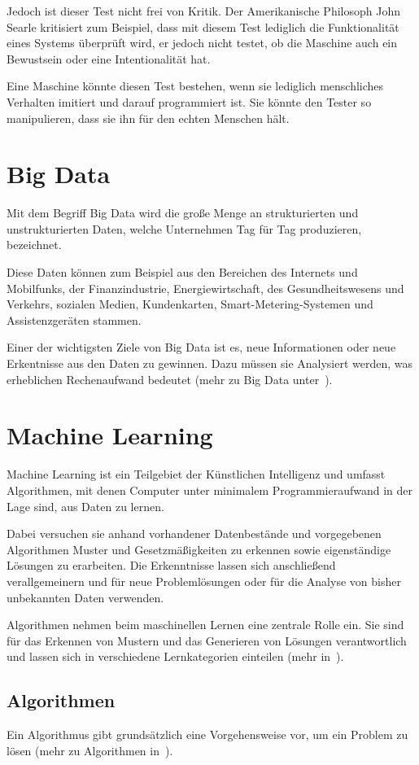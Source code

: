Jedoch ist dieser Test nicht frei von Kritik. Der Amerikanische Philosoph John Searle kritisiert zum Beispiel, dass mit
diesem Test lediglich die Funktionalität eines Systems überprüft wird, er jedoch nicht testet, ob die Maschine auch ein
Bewustsein oder eine Intentionalität hat.

Eine Maschine könnte diesen Test bestehen, wenn sie lediglich menschliches Verhalten imitiert und darauf programmiert
ist. Sie könnte den Tester so manipulieren, dass sie ihn für den echten Menschen hält.

\section{Big Data}
Mit dem Begriff Big Data wird die große Menge an strukturierten und unstrukturierten Daten, welche Unternehmen Tag für
Tag produzieren, bezeichnet.

Diese Daten können zum Beispiel aus den Bereichen des Internets und Mobilfunks, der Finanzindustrie, Energiewirtschaft,
des Gesundheitswesens und Verkehrs, sozialen Medien, Kundenkarten, Smart-Metering-Systemen und Assistenzgeräten stammen.

Einer der wichtigsten Ziele von Big Data ist es, neue Informationen oder neue Erkentnisse aus den Daten zu gewinnen.
Dazu müssen sie Analysiert werden, was erheblichen Rechenaufwand bedeutet (mehr zu Big Data
unter~\cite{book_grundlagen_bigdata}).

\section{Machine Learning}
Machine Learning ist ein Teilgebiet der Künstlichen Intelligenz und umfasst Algorithmen, mit denen Computer unter
minimalem Programmieraufwand in der Lage sind, aus Daten zu lernen.

Dabei versuchen sie anhand vorhandener Datenbestände und vorgegebenen Algorithmen Muster und Gesetzmäßigkeiten zu
erkennen sowie eigenständige Lösungen zu erarbeiten. Die Erkenntnisse lassen sich anschließend verallgemeinern und für
neue Problemlösungen oder für die Analyse von bisher unbekannten Daten verwenden.

Algorithmen nehmen beim maschinellen Lernen eine zentrale Rolle ein. Sie sind für das Erkennen von Mustern und das
Generieren von Lösungen verantwortlich und lassen sich in verschiedene Lernkategorien einteilen
(mehr in~\cite{book_grundlagen_machinelearning}).

\subsection{Algorithmen}
Ein Algorithmus gibt grundsätzlich eine Vorgehensweise vor, um ein Problem zu lösen (mehr zu Algorithmen
in~\cite{book_grundlagen_algorithmen}).

